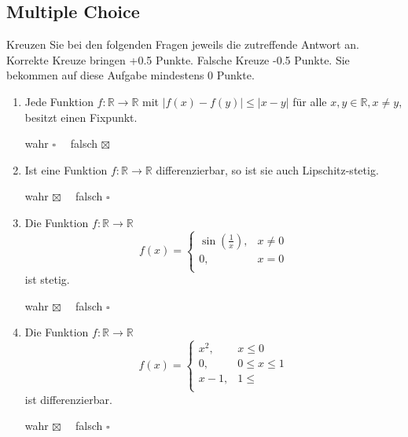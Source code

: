 \documentclass[a4paper]{article}
\begin{document}
\subsection{Multiple Choice}
Kreuzen Sie bei den folgenden Fragen jeweils die zutreffende Antwort an. Korrekte Kreuze bringen +0.5 Punkte. Falsche Kreuze -0.5 Punkte. Sie bekommen auf diese Aufgabe mindestens 0 Punkte.
\begin{enumerate}[label=(\alph*)]
    \item Jede Funktion $f:\mathbb{R}\to\mathbb{R}$ mit $|f(x)-f(y)|\leq |x-y|$ für alle $x,y \in \mathbb{R}, x\neq y$, besitzt einen Fixpunkt.
    \begin{flushright}
        wahr $\square\quad$ falsch $\boxtimes$
    \end{flushright}
    \item Ist eine Funktion $f: \mathbb{R} \to \mathbb{R}$ differenzierbar, so ist sie auch Lipschitz-stetig.
    \begin{flushright}
        wahr $\boxtimes\quad$ falsch $\square$
    \end{flushright}
    \item Die Funktion $f: \mathbb{R}\to \mathbb{R}$
    \[f(x) = \begin{cases}
        \sin \left(\frac{1}{x}\right), & x\neq 0\\
        0, & x=0\\
    \end{cases}\] ist stetig.
    \begin{flushright}
        wahr $\boxtimes\quad$ falsch $\square$
    \end{flushright}
    \item Die Funktion $f: \mathbb{R}\to \mathbb{R}$
    \[f(x)=\begin{cases}
        x^2, & x\leq 0\\
        0, & 0\leq x\leq 1\\
        x-1, & 1\leq\\
    \end{cases}\]
    ist differenzierbar.
    \begin{flushright}
        wahr $\boxtimes\quad$ falsch $\square$
    \end{flushright}
\end{enumerate}
\end{document}
